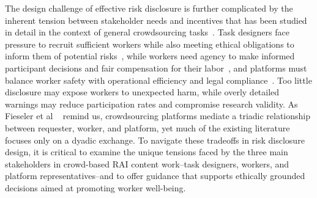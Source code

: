 The design challenge of effective risk disclosure is further complicated by the inherent tension between stakeholder needs and incentives that has been studied in detail in the context of general crowdsourcing tasks~\cite{finnerty2013keep, gaikwad2016boomerang, salehi2015we, irani2013turkopticon, salehi2018ink}. Task designers face pressure to recruit sufficient workers while also meeting ethical obligations to inform them of potential risks~\cite{qian2025locating, finnerty2013keep, kittur2008crowdsourcing, zheng2011task, bragg2018sprout}, while workers need agency to make informed participant decisions and fair compensation for their labor~\cite{irani2013turkopticon, salehi2018ink, martin2014being, silberman2018responsible, toxtli2021quantifying, schlicher2021flexible}, and platforms must balance worker safety with operational efficiency and legal compliance~\cite{gaikwad2016boomerang, xu2017incentivizing, xia2020privacy, allen2018design}. Too little disclosure may expose workers to unexpected harm, while overly detailed warnings may reduce participation rates and compromise research validity. 
As Fieseler et al ~\cite{fieseler_unfairness_2019} remind us, crowdsourcing platforms mediate a triadic relationship between requester, worker, and platform, yet much of the existing literature focuses only on a dyadic exchange.
To navigate these tradeoffs in risk disclosure design, it is critical to examine the unique tensions faced by the three main stakeholders in crowd-based RAI content work--task designers, workers, and platform representatives--and to offer guidance that supports ethically grounded decisions aimed at promoting worker well-being.



